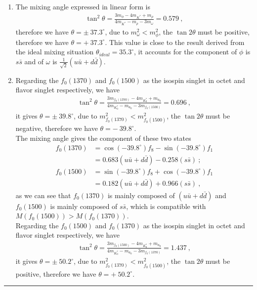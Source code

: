 \documentclass[12pt,twoside]{report}
\numberwithin{problemname}{chapter}
\newenvironment{solution}{\vspace{1em}\par\noindent{\large\textbf{\textsc{Solution}}}\par}{\vspace{1em}\hrule}
\begin{document}
\begin{solution}
\begin{enumerate}[1)]
    \item The mixing angle expressed in linear form is
    \begin{align}
        \tan^2{\theta}=\frac{3m_{\phi}-4m_{K^*}+m_{\rho}}{4m_{K^*}-m_{\rho}-3m_{\omega}}=0.579\ ,
    \end{align}
    therefore we have $\theta=\pm ~37.3^\circ$, due to $m^2_{\omega}<m^2_{\phi}$, the $\tan{2\theta}$ must be positive, therefore we have $\theta=+~37.3^\circ$. This value is close to the result derived from the ideal mixing situation $\theta_{ideal}=35.3^\circ$, it accounts for the component of $\phi$ is $s\bar{s}$ and of $\omega$ is $\frac{1}{\sqrt{2}}(u\bar{u}+d\bar{d})$.
    \item Regarding the $f_0(1370)$ and $f_0(1500)$ as the isospin singlet in octet and flavor singlet respectively, we have
    \begin{align}
        \tan^2{\theta}=\frac{3m_{f_0(1370)}-4m_{K^*_0}+m_{a_0}}{4m_{K^*_0}-m_{a_0}-3m_{f_0(1500)}}=0.696\ ,
    \end{align}
    it gives $\theta=\pm ~39.8^\circ$, due to $m^2_{f_0(1370)}<m^2_{f_0(1500)}$, the $\tan{2\theta}$ must be negative, therefore we have $\theta=-~39.8^\circ$.\\
    The mixing angle gives the component of these two states
    \begin{align}
        f_0(1370)&=\cos{(-39.8^\circ)}f_8-\sin{(-39.8^\circ)}f_1 \nonumber \\
        &=0.683(u\bar{u}+d\bar{d})-0.258(s\bar{s})\ ; \\
        f_0(1500)&=\sin{(-39.8^\circ)}f_8+\cos{(-39.8^\circ)}f_1 \nonumber \\
        &=0.182(u\bar{u}+d\bar{d})+0.966(s\bar{s})\ ,
    \end{align}
    as we can see that $f_0(1370)$ is mainly composed of $(u\bar{u}+d\bar{d})$ and $f_0(1500)$ is mainly composed of $s\bar{s}$, which is compatible with $M(f_0(1500))>M(f_0(1370))$.\\
    Regarding the $f_0(1500)$ and $f_0(1370)$ as the isospin singlet in octet and flavor singlet respectively, we have
    \begin{align}
        \tan^2{\theta}=\frac{3m_{f_0(1500)}-4m_{K^*_0}+m_{a_0}}{4m_{K^*_0}-m_{a_0}-3m_{f_0(1370)}}=1.437\ ,
    \end{align}
    it gives $\theta=\pm ~50.2^\circ$, due to $m^2_{f_0(1370)}<m^2_{f_0(1500)}$, the $\tan{2\theta}$ must be positive, therefore we have $\theta=+~50.2^\circ$.\\

\end{enumerate}
\end{solution}
\end{document}
